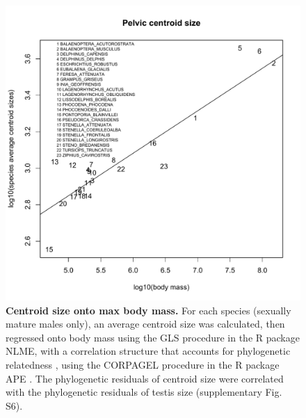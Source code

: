 \documentclass[12pt]{article}
\begin{document}
\begin{figure}
\begin{center}
  \includegraphics[width=\textwidth]{S5}
\end{center}
\caption{
\textbf{Centroid size onto max body mass.} For each species (sexually mature
males only), an average centroid size was calculated, then regressed onto body mass using the GLS
procedure in the R package NLME, with a correlation structure that accounts for phylogenetic
relatedness \citep{pagel1999}, using the CORPAGEL procedure in the R package APE \citep{paradis2004}. The phylogenetic residuals
of centroid size were correlated with the phylogenetic residuals of testis size (supplementary Fig. S6).
}
\end{figure}
\end{document}
